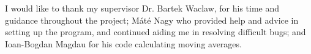 \documentclass[a4paper,12pt]{article}
\begin{document}
	I would like to thank my supervisor Dr. Bartek Waclaw, for his time and guidance throughout the project; Máté Nagy who provided help and advice in setting up the program, and continued aiding me in resolving difficult bugs; and Ioan-Bogdan Magdau for his code calculating moving averages. 

	
	



\lstset{basicstyle=\tiny,style=myCustomMatlabStyle}
%	
%	
%	
%	
%	
%	
\end{document}
